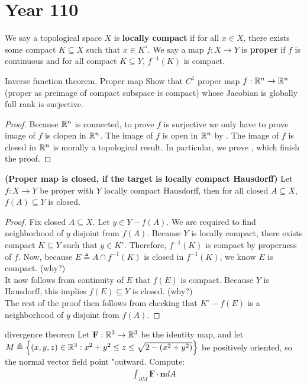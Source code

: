 \documentclass{report}
\begin{document}
\section{Year 110}
We say a topological space $X$ is \textbf{locally compact} if for all $x \in X$, there exists some compact $K \subseteq X$ such that $x \in K^{\circ }$. We say a map $f:X\rightarrow Y$ is \textbf{proper} if $f$ is continuous and for all compact $K\subseteq Y$, $f^{-1}(K)$ is compact.
\begin{question}{Inverse function theorem, Proper map}{}
  Show that $C^1$ proper map  $f:\mathbb{R}^n\rightarrow \mathbb{R}^n$ (proper as preimage of compact subspace is compact) whose Jacobian is globally full rank is surjective. 
\end{question}
\begin{proof}
  Because $\mathbb{R}^n$ is connected,  to prove $f$ is surjective we only have to prove image of $f$ is clopen in $\mathbb{R}^n$. The image of $f$ is open in $\mathbb{R}^n$ by . The image of $f$ is closed in $\mathbb{R}^n$ is morally a topological result. In particular, we prove  , which finish the proof.
\end{proof}
\begin{theorem}
\label{THpmic}
\textbf{(Proper map is closed, if the target is locally compact Hausdorff)} Let $f:X\rightarrow Y$ be proper with $Y$ locally compact Hausdorff, then for all closed $A \subseteq X$, $f(A)\subseteq Y$ is closed.
\end{theorem}
\begin{proof}
Fix closed $A\subseteq X$. Let $y \in Y- f(A)$. We are required to find neighborhood of $y$ disjoint from $f(A)$. Because $Y$ is locally compact, there exists compact $K \subseteq Y$ such that $y \in K^{\circ }$. Therefore, $f^{-1}(K)$ is compact by properness of $f$. Now, because $E \triangleq A \cap f^{-1}(K)$ is closed in $f^{-1}(K)$, we know $E$ is compact.  (why?)  \\

It now follows from continuity of  $E$ that $f(E)$ is compact. Because $Y$ is Hausdorff, this implies $f(E)\subseteq Y$ is closed. (why?) \\

The rest of the proof then follows from checking that $K^{\circ }-f(E)$ is a neighborhood of $y$ disjoint from $f(A)$. 
\end{proof}
\begin{question}{divergence theorem}{}
Let $\textbf{F}:\mathbb{R}^3 \rightarrow \mathbb{R}^3$ be the identity map, and let $M\triangleq \left\{ (x,y,z)\in\mathbb{R}^3: x^2+y^2 \leq z \leq \sqrt{2-(x^2+y^2)} \right\}$ be positively oriented, so the normal vector field point "outward. Compute:
\begin{align*}
\int_{\partial M} \textbf{F} \cdot \textbf{n} dA
\end{align*}
\end{question}
\end{document}
